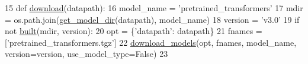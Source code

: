 \begin{DoxyCode}
15 \textcolor{keyword}{def }\hyperlink{namespaceparlai_1_1zoo_1_1pretrained__transformers_1_1build_afaead0deab400e1c516706e85dd4ed9b}{download}(datapath):
16     model\_name = \textcolor{stringliteral}{'pretrained\_transformers'}
17     mdir = os.path.join(\hyperlink{namespaceparlai_1_1core_1_1build__data_ad2fe6222094caae59f304931aee0952a}{get\_model\_dir}(datapath), model\_name)
18     version = \textcolor{stringliteral}{'v3.0'}
19     \textcolor{keywordflow}{if} \textcolor{keywordflow}{not} \hyperlink{namespaceparlai_1_1core_1_1build__data_ad834e1a9be02e18a6c2de2b03b9a8f10}{built}(mdir, version):
20         opt = \{\textcolor{stringliteral}{'datapath'}: datapath\}
21         fnames = [\textcolor{stringliteral}{'pretrained\_transformers.tgz'}]
22         \hyperlink{namespaceparlai_1_1core_1_1build__data_ab697f23f05d3e36d7979fe5e0ed7911e}{download\_models}(opt, fnames, model\_name, version=version, use\_model\_type=\textcolor{keyword}{False})
23 \end{DoxyCode}

